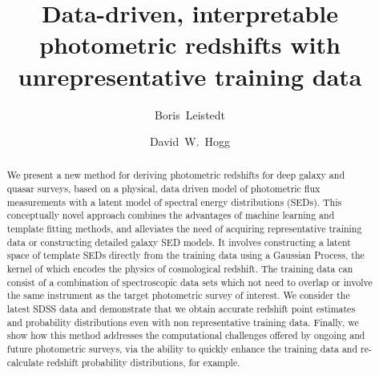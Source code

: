 \documentclass[aps,prd,showpacs,superscriptaddress,groupedaddress]{revtex4}  %
\begin{document}
 
\title{Data-driven, interpretable photometric redshifts %
with unrepresentative training data}

\author{Boris~Leistedt}
  
\author{David~W.~Hogg}
  
  
\begin{abstract}
We present a new method for deriving photometric redshifts for deep galaxy and quasar surveys, based on a physical, data driven model of photometric flux measurements with a latent model of spectral energy distributions (SEDs).
This conceptually novel approach combines the advantages of machine learning and template fitting methods, and alleviates the need of acquiring representative training data or constructing detailed galaxy SED models. 
It involves constructing a latent space of template SEDs directly from the training data using a Gaussian Process, the kernel of which encodes the physics of cosmological redshift. 
The training data can consist of a combination of spectroscopic data sets which not need to overlap or involve the same instrument as the target photometric survey of interest. 
We consider the latest SDSS data and demonstrate that we obtain accurate redshift point estimates and probability distributions even with non representative training data. 
Finally, we show how this method addresses the computational challenges offered by ongoing and future photometric surveys, via the ability to quickly enhance the training data and re-calculate redshift probability distributions, for example.
\end{abstract}


\maketitle

  
\end{document}
